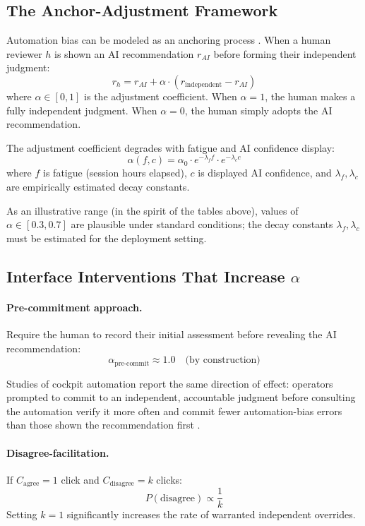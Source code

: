 \subsection{The Anchor-Adjustment Framework}

Automation bias can be modeled as an anchoring process \autocite{tversky1974judgment}. When a human reviewer $h$ is shown an AI recommendation $r_{AI}$ before forming their independent judgment:
\[
r_h = r_{AI} + \alpha \cdot (r_{\text{independent}} - r_{AI})
\]
where $\alpha \in [0, 1]$ is the adjustment coefficient. When $\alpha = 1$, the human makes a fully independent judgment. When $\alpha = 0$, the human simply adopts the AI recommendation.

The adjustment coefficient degrades with fatigue and AI confidence display:
\[
\alpha(f, c) = \alpha_0 \cdot e^{-\lambda_f f} \cdot e^{-\lambda_c c}
\]
where $f$ is fatigue (session hours elapsed), $c$ is displayed AI confidence, and $\lambda_f, \lambda_c$ are empirically estimated decay constants.

As an illustrative range (in the spirit of the tables above), values of $\alpha \in [0.3, 0.7]$ are plausible under standard conditions; the decay constants $\lambda_f, \lambda_c$ must be estimated for the deployment setting.

\subsection{Interface Interventions That Increase $\alpha$}

\paragraph{Pre-commitment approach.}
Require the human to record their initial assessment before revealing the AI recommendation:
\[
\alpha_{\text{pre-commit}} \approx 1.0 \quad \text{(by construction)}
\]

Studies of cockpit automation report the same direction of effect: operators prompted to commit to an independent, accountable judgment before consulting the automation verify it more often and commit fewer automation-bias errors than those shown the recommendation first \autocite{mosier1998automation}.

\paragraph{Disagree-facilitation.}
If $C_{\text{agree}} = 1$ click and $C_{\text{disagree}} = k$ clicks:
\[
P(\text{disagree}) \propto \frac{1}{k}
\]
Setting $k = 1$ significantly increases the rate of warranted independent overrides.

